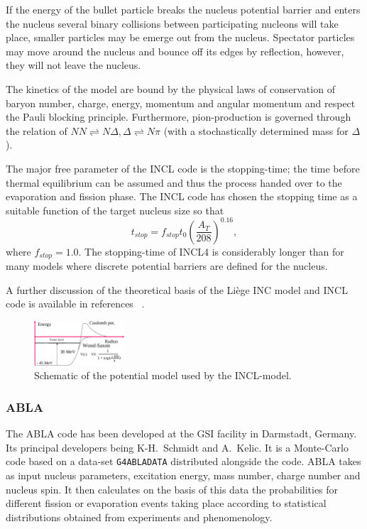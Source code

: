 If the energy of the bullet particle breaks the nucleus potential barrier and enters the nucleus several binary collisions between participating nucleons will take place, smaller particles may be emerge out from the nucleus. Spectator particles may move around the nucleus and bounce off its edges by reflection, however, they will not leave the nucleus.

The kinetics of the model are bound by the physical laws of conservation of baryon number, charge, energy, momentum and angular momentum and respect the Pauli blocking principle. Furthermore, pion-production is governed through the relation of $NN \rightleftharpoons N \Delta, \Delta \rightleftharpoons N\pi$ (with a stochastically determined mass for $\Delta$).

The major free parameter of the INCL code is the stopping-time; the time before thermal equilibrium can be assumed and thus the process handed over to the evaporation and fission phase. The INCL code has chosen the stopping time as a suitable function of the target nucleus size so that $$t_{stop} = f_{stop}t_{0}(\frac{A_T}{208})^{0.16},$$ where $f_{stop} = 1.0$. The stopping-time of INCL4 is considerably longer than for many models where discrete potential barriers are defined for the nucleus.

A further discussion of the theoretical basis of the Liège INC model and INCL code is available in references ~\cite{PhysRevC.66.044615,iia}.

\begin{figure}[ht]
\begin{center}
\includegraphics[width=0.3\textwidth]{images/inclPotential.png}  
\caption{\label{fig:inclpotential} Schematic of the potential model used by the INCL-model.}
 
 \end{center}
 \end{figure}


\subsubsection{ABLA}

The ABLA code has been developed at the GSI facility in Darmstadt, Germany. Its principal developers being K-H.~Schmidt and A.~Kelic. It is a Monte-Carlo code based on a data-set {\tt G4ABLADATA} distributed alongside the code. ABLA takes as input nucleus parameters, excitation energy, mass number, charge number and nucleus spin. It then calculates on the basis of this data the probabilities for different fission or evaporation events taking place according to statistical distributions obtained from experiments and phenomenology.

